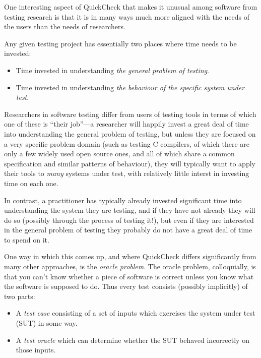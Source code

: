 One interesting aspect of QuickCheck that makes it unusual among software from testing research is that it is in many ways much more aligned with the needs of the users than the needs of researchers.

Any given testing project has essentially two places where time needs to be invested:

\begin{itemize}
\item Time invested in understanding \emph{the general problem of testing}.
\item Time invested in understanding \emph{the behaviour of the specific system under test}.
\end{itemize}

Researchers in software testing differ from users of testing tools in terms of which one of these is ``their job''---a
researcher will happily invest a great deal of time into understanding the general problem of testing,
but unless they are focused on a very specific problem domain (such as testing C compilers,
of which there are only a few widely used open source ones,
and all of which share a common specification and similar patterns of behaviour),
they will typically want to apply their tools to \emph{many} systems under test,
with relatively little interst in investing time on each one.

In contrast,
a practitioner has typically already invested significant time into understanding the system they are testing,
and if they have not already they will do so (possibly through the process of testing it!),
but even if they are interested in the general problem of testing they probably do not have a great deal of time to spend on it.

One way in which this comes up,
and where QuickCheck differs significantly from many other approaches,
is the \emph{oracle problem}.
The oracle problem,
colloquially,
is that you can't know whether a piece of software is correct unless you know what the software is supposed to do.
Thus every test consists (possibly implicitly) of two parts:

\begin{itemize}
\item A \emph{test case} consisting of a set of inputs which exercises the system under test (SUT) in some way.
\item A \emph{test oracle} which can determine whether the SUT behaved incorrectly on those inputs.
\end{itemize}

